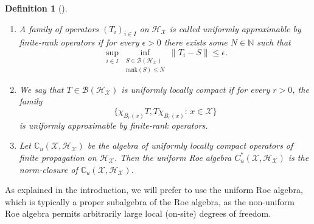 \documentclass[12pt]{amsart}
\newtheorem{definition}[theorem]{Definition}
\newcommand{\CM}{{\mathbb C}}
\newcommand{\NM}{{\mathbb N}}
\newcommand{\Bb}{{\mathcal B}}
\newcommand{\Hh}{{\mathcal H}}
\newcommand{\Xx}{{\mathcal X}}
\begin{document}
\begin{definition}[{\cite{Spakula2009}}]
\label{def:uniform_roe}
\leavevmode\newline
\vspace{-0.5cm}
\begin{enumerate}
\item[(i)]
A family of operators $(T_i)_{i\in I}$ on $\Hh_\Xx$ is called uniformly approximable by finite-rank operators if for every $\epsilon>0$ there exists some $N\in \NM$ such that \[\sup_{i\in I}\inf_{\substack{S\in \Bb(\Hh_\Xx)\\\mathrm{rank}(S)\leq N}} \|T_i-S\| \leq \epsilon.\]
\item[(ii)]
We say that $T\in \Bb(\Hh_{\Xx})$ is uniformly locally compact  if for every $r>0$, the family
\[\{\chi_{B_r(x)} T, T\chi_{B_r(x)}: \, x\in \Xx\}\]
is uniformly approximable by finite-rank operators.
\item[(iii)] Let $\CM_u(\Xx,\Hh_\Xx)$ be the algebra of uniformly locally compact operators of finite propagation on $\Hh_\Xx$. Then the uniform Roe algebra $C^*_u(\Xx, \Hh_\Xx)$ is the norm-closure of $\CM_u(\Xx,\Hh_\Xx)$.
\end{enumerate}
\end{definition}
As explained in the introduction, we will prefer to use the uniform Roe algebra, which is typically a proper subalgebra of the Roe algebra, as the non-uniform Roe algebra permits arbitrarily large local (on-site) degrees of freedom.
\end{document}
